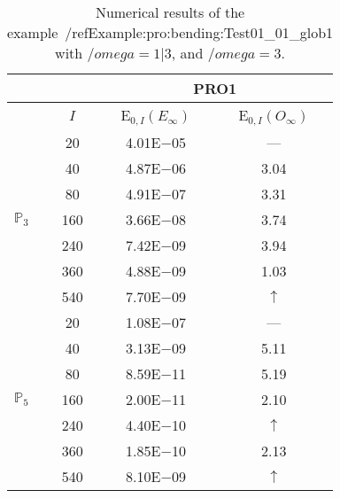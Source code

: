 \begin{table}[H]
\caption{Numerical results of the example~/ref{Example:pro:bending:Test01_01_glob1} with $/omega=1|3$, and $/omega=3$.}
\setlength{\tabcolsep}{5pt}
\centering
\begin{tabular}{@{}l c c c@{}}
\toprule
 &  & \multicolumn{2}{c}{PRO1}\\
\midrule
 & $I$ & E$_{0,I}(E_{\infty})$ & E$_{0,I}(O_{\infty})$\\
\midrule
\multirow{7}{*}{$\mathbb{P}_{3}$}
 & 20 & 4.01E$-$05 & ---\\
 & 40 & 4.87E$-$06 & 3.04\\
 & 80 & 4.91E$-$07 & 3.31\\
 & 160 & 3.66E$-$08 & 3.74\\
 & 240 & 7.42E$-$09 & 3.94\\
 & 360 & 4.88E$-$09 & 1.03\\
 & 540 & 7.70E$-$09 & $\uparrow$\\
\midrule
\multirow{7}{*}{$\mathbb{P}_{5}$}
 & 20 & 1.08E$-$07 & ---\\
 & 40 & 3.13E$-$09 & 5.11\\
 & 80 & 8.59E$-$11 & 5.19\\
 & 160 & 2.00E$-$11 & 2.10\\
 & 240 & 4.40E$-$10 & $\uparrow$\\
 & 360 & 1.85E$-$10 & 2.13\\
 & 540 & 8.10E$-$09 & $\uparrow$\\
\bottomrule
\end{tabular}
\label{Table:pRO:test_01_01_test3_pro3}
\end{table}
